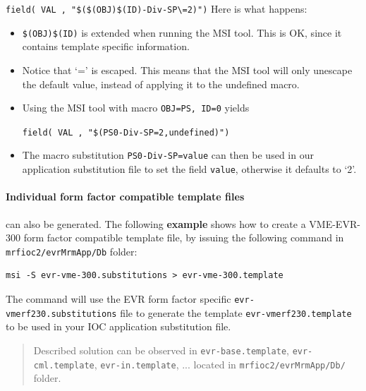 \documentclass[12pt,a4paper]{article}
\begin{document}
\texttt{field( VAL , "\$(\$(OBJ)\$(ID)-Div-SP\textbackslash{}=2)")} 
Here is what happens: 
\begin{itemize}
\item 
	\texttt{\$(OBJ)\$(ID)} is extended when running the MSI tool.
This is OK, since it contains template specific information.
\item 
	Notice that `=' is escaped. This means that the MSI tool will only unescape the
default value, instead of applying it to the undefined macro. 
\item  
	Using the MSI tool with macro \texttt{OBJ=PS, ID=0} yields
	
\texttt{field( VAL , "\$(PS0-Div-SP=2,undefined)")} 
\item 
	The macro substitution \texttt{PS0-Div-SP=value} can then be used in our application substitution file to set the field \texttt{value}, otherwise it defaults to `2'.
\end{itemize}

\paragraph{Individual form factor compatible template files} can also be generated. The following \textbf{example} shows how to create a VME-EVR-300 form factor compatible template file, by issuing the following command in \newline\texttt{mrfioc2/evrMrmApp/Db} folder:

\begin{verbatim}
msi -S evr-vme-300.substitutions > evr-vme-300.template 
\end{verbatim}

The command will use the EVR form factor specific \newline\texttt{evr-vmerf230.substitutions}
file to generate the template \newline\texttt{evr-vmerf230.template} to be used in your IOC application substitution file.

\begin{quote}
Described solution can be observed in \texttt{evr-base.template},
\texttt{evr-cml.template}, \texttt{evr-in.template}, ... located in
\texttt{mrfioc2/evrMrmApp/Db/} folder.
\end{quote}
\end{document}
